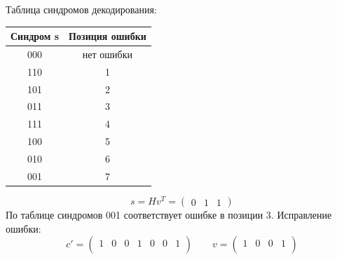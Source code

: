 \documentclass[12pt]{article}
\begin{document}
\begin{flushleft}
    Таблица синдромов декодирования: \\
    \begin{table}[h!]
        \centering
        \begin{tabular}{|c|c|}
            \hline
            Синдром s & Позиция ошибки \\
            \hline
            000	& нет ошибки \\
            110	& 1 \\
            101	& 2 \\
            011	& 3 \\
            111	& 4 \\
            100	& 5 \\
            010	& 6 \\
            001	& 7 \\
            \hline
        \end{tabular}
    \end{table}

    \[ s = Hv^T = \begin{pmatrix}
        0 & 1 & 1
    \end{pmatrix} \]
    По таблице синдромов 001 соответствует ошибке в позиции 3. Исправление ошибки: \\
    \[ c' = \begin{pmatrix}
        1 & 0 & 0 & 1 & 0 & 0 & 1 \\
    \end{pmatrix} \qquad  v = \begin{pmatrix}
        1 & 0 & 0 & 1 \\
    \end{pmatrix}\]

\end{flushleft}


\newpage
\end{document}
